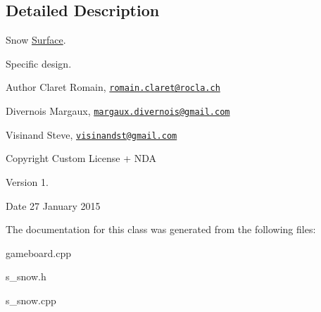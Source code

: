 \subsection{Detailed Description}
Snow \hyperlink{class_surface}{Surface}. 

Specific design. \begin{DoxyAuthor}{Author}
Claret Romain, \href{mailto:romain.claret@rocla.ch}{\tt romain.\+claret@rocla.\+ch} 

Divernois Margaux, \href{mailto:margaux.divernois@gmail.com}{\tt margaux.\+divernois@gmail.\+com} 

Visinand Steve, \href{mailto:visinandst@gmail.com}{\tt visinandst@gmail.\+com} 
\end{DoxyAuthor}
\begin{DoxyCopyright}{Copyright}
Custom License + N\+D\+A 
\end{DoxyCopyright}
\begin{DoxyVersion}{Version}
1. 
\end{DoxyVersion}
\begin{DoxyDate}{Date}
27 January 2015 
\end{DoxyDate}


The documentation for this class was generated from the following files\+:\begin{DoxyCompactItemize}
\item 
gameboard.\+cpp\item 
s\+\_\+snow.\+h\item 
s\+\_\+snow.\+cpp\end{DoxyCompactItemize}
